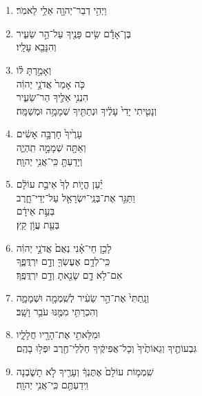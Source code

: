 \documentclass[12pt,a4paper,titlepage]{article}
\def \pscolor{red} %
\def \pslabelsep{-0.65em} %
\def \psleftmargin{0em} %
\begin{document}
\begin{hebrew}
      \subsection*{}
      \section*{}
      \vspace{-0.6mm}
      \begin{enumerate}[leftmargin=\psleftmargin, labelsep=\pslabelsep, label=\fontspec{Linux Libertine}\arabic*, font=\color{\pscolor}\small\textsuperscript, parsep=0em, itemsep=0em, topsep=0em]
            \item וַיְהִ֥י דְבַר־יְהוָ֖ה אֵלַ֥י לֵאמֹֽר׃
            \item בֶּן־אָדָ֕ם שִׂ֥ים פָּנֶ֖יךָ עַל־הַ֣ר שֵׂעִ֑יר \\ וְהִנָּבֵ֖א עָלָֽיו׃
            \item וְאָמַ֣רְתָּ לּ֗וֹ\\  כֹּ֤ה אָמַר֙ אֲדֹנָ֣י יְהוִ֔ה \\ הִנְנִ֥י אֵלֶ֖יךָ הַר־שֵׂעִ֑יר \\ וְנָטִ֤יתִי יָדִי֙ עָלֶ֔יךָ וּנְתַתִּ֖יךָ שְׁמָמָ֥ה וּמְשַׁמָּֽה׃
            \item עָרֶ֙יךָ֙ חָרְבָּ֣ה אָשִׂ֔ים \\ וְאַתָּ֖ה שְׁמָמָ֣ה תִֽהְיֶ֑ה \\ וְיָדַעְתָּ֖ כִּֽי־אֲנִ֥י יְהוָֽה׃
            \item יַ֗עַן הֱי֤וֹת לְךָ֙ אֵיבַ֣ת עוֹלָ֔ם \\ וַתַּגֵּ֥ר אֶת־בְּנֵֽי־יִשְׂרָאֵ֖ל עַל־יְדֵי־חָ֑רֶב \\ בְּעֵ֣ת אֵידָ֔ם \\ בְּעֵ֖ת עֲוֹ֥ן קֵֽץ׃
            \item לָכֵ֣ן חַי־אָ֗נִי נְאֻם֙ אֲדֹנָ֣י יְהוִ֔ה \\ כִּֽי־לְדָ֥ם אֶעֶשְׂךָ֖ וְדָ֣ם יִרְדֲּפֶ֑ךָ \\ אִם־לֹ֥א דָ֛ם שָׂנֵ֖אתָ וְדָ֥ם יִרְדֲּפֶֽךָ׃
            \item וְנָֽתַתִּי֙ אֶת־הַ֣ר שֵׂעִ֔יר לְשִֽׁמְמָ֖ה וּשְׁמָמָ֑ה \\ וְהִכְרַתִּ֥י מִמֶּ֖נּוּ עֹבֵ֥ר וָשָֽׁב׃
            \item וּמִלֵּאתִ֥י אֶת־הָרָ֖יו חֲלָלָ֑יו \\ גִּבְעוֹתֶ֤יךָ וְגֵאוֹתֶ֙יךָ֙ וְכָל־אֲפִיקֶ֔יךָ חַלְלֵי־חֶ֖רֶב יִפְּל֥וּ בָהֶֽם׃
            \item שִֽׁמְמ֤וֹת עוֹלָם֙ אֶתֶּנְךָ֔ וְעָרֶ֖יךָ לֹ֣א תָשֹׁ֑בְנָה \\ וִֽידַעְתֶּ֖ם כִּֽי־אֲנִ֥י יְהוָֽה׃

\end{enumerate}
\end{hebrew}
\end{document}
